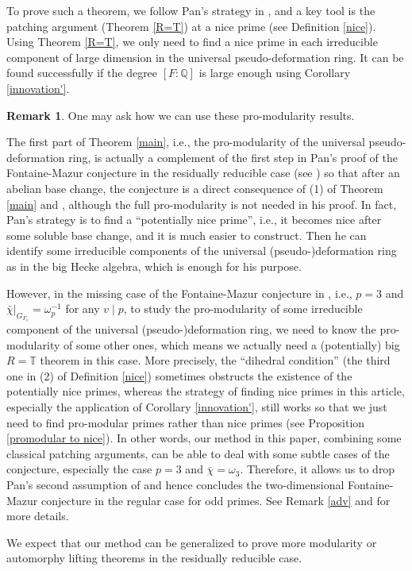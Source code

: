 \documentclass[12pt]{amsart}
\theoremstyle{plain}
\theoremstyle{definition}
\newtheorem{rem}[thm]{Remark}
\theoremstyle{remark}
\begin{document}
	To prove such a theorem, we follow Pan's strategy in \cite{pan2022fontaine}, and a key tool is the patching argument (Theorem \ref{R=T}) at a nice prime (see Definition \ref{nice}). Using Theorem \ref{R=T}, we only need to find a nice prime in each irreducible component of large dimension in the universal pseudo-deformation ring. It can be found successfully if the degree $[F: \mathbb{Q}]$ is large enough using Corollary \ref{innovation'}.

\begin{rem}
	One may ask how we can use these pro-modularity results.
	
	The first part of Theorem \ref{main}, i.e., the pro-modularity of the universal pseudo-deformation ring, is actually a complement of the first step in Pan's proof of the Fontaine-Mazur conjecture in the residually reducible case (see \cite[page 1032]{pan2022fontaine}) so that after an abelian base change, the conjecture is a direct consequence of (1) of Theorem \ref{main} and \cite[Corollary 3.5.10]{pan2022fontaine}, although the full pro-modularity is not needed in his proof. In fact, Pan's strategy is to find a ``potentially nice prime'', i.e., it becomes nice  after some soluble base change,  and it is much easier to construct. Then he can identify some irreducible components of the universal (pseudo-)deformation ring as in the big Hecke algebra, which is enough for his purpose.
	
	 However, in the missing case of the Fontaine-Mazur conjecture in \cite{pan2022fontaine}, i.e., $p=3$ and $\bar{\chi}|_{G_{F_v}}=\omega_p^{-1}$ for any $v \mid p$, to study the pro-modularity of some irreducible component of the universal (pseudo-)deformation ring, we need to know the pro-modularity of some other ones, which means we actually need a (potentially) big $R=\mathbb{T}$ theorem in this case. More precisely, the ``dihedral condition'' (the third one in (2) of Definition \ref{nice}) sometimes obstructs the existence of the potentially nice primes, whereas the strategy of finding nice primes in this article, especially the application of Corollary \ref{innovation'}, still works so that we just need to find pro-modular primes rather than nice primes (see Proposition \ref{promodular to nice}). In other words, our method in this paper, combining some classical patching arguments, can be able to deal with some subtle cases of the conjecture, especially the case $p=3$ and $ \bar{\chi}=\omega_3$. Therefore, it allows us to drop Pan's second assumption of \cite[Theorem 1.0.4]{pan2022fontaine} and hence concludes the two-dimensional Fontaine-Mazur conjecture in the regular case for odd primes. See Remark \ref{adv} and \cite[Section 5]{ZHANG2024} for more details.
	 
	 We expect that our method can be generalized to prove more modularity or automorphy lifting theorems in the residually reducible case.
\end{rem}
\end{document}
